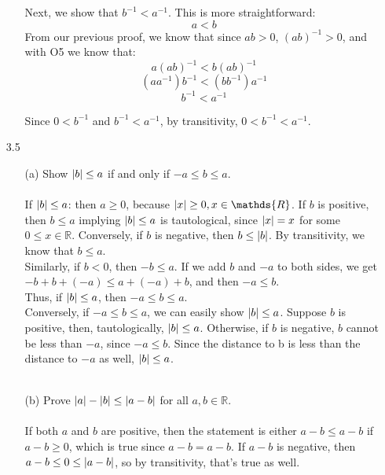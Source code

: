 \begin{itemize}
\begin{itemize}
        Next, we show that $b^{-1} < a^{-1}$. This is more straightforward:
        $$a < b$$
        From our previous proof, we know that since $ab > 0$, $(ab)^{-1} > 0$, and with O5 we know that:
        $$a(ab)^{-1} < b(ab)^{-1}$$
        $$(aa^{-1})b^{-1} < (bb^{-1})a^{-1}$$
        $$b^{-1} < a^{-1}$$

        Since $0 < b^{-1}$ and $b^{-1} < a^{-1}$, by transitivity, $0 < b^{-1} < a^{-1}$.
    \end{itemize}
  \item[3.5]
    \begin{itemize}
      \item [(a)] Show $\left\vert b \right\vert \leq a$ if and only if $-a \leq b \leq a$.\\\\

        If $\left\vert b \right\vert \leq a$: then $a \geq 0$, because $\abs{x} \geq 0, x \in \mathds{R}$. If $b$ is positive, then $b \leq a$ implying $\left\vert b \right\vert \leq a$ is tautological, since $\left\vert x \right\vert = x$ for some $0 \leq x \in \mathds{R}$. Conversely, if $b$ is negative, then $b \leq \left\vert b \right\vert$. By transitivity, we know that $b \leq a$.\\

        Similarly, if $b < 0$, then $-b \leq a$. If we add $b$ and $-a$ to both sides, we get $-b + b + (-a) \leq a + (-a) + b$, and then $-a \leq b$.\\

        Thus, if $\left\vert b \right\vert \leq a$, then $-a \leq b \leq a$.\\

        Conversely, if $-a \leq b \leq a$, we can easily show $\left\vert b \right\vert \leq a$. Suppose $b$ is positive, then, tautologically, $\left\vert b \right\vert \leq a$. Otherwise, if $b$ is negative, $b$ cannot be less than $-a$, since $-a \leq b$. Since the distance to b is less than the distance to $-a$ as well, $\left\vert b \right\vert \leq a$.\\\\


      \item [(b)] Prove $\left\vert a \right\vert - \left\vert b \right\vert \leq \left\vert a - b \right\vert$ for all $a, b \in \mathds{R}$.\\\\

        If both $a$ and $b$ are positive, then the statement is either $a - b \leq a - b$ if $a-b \geq 0$, which is true since $a-b = a-b$. If $a-b$ is negative, then $a - b \leq 0 \leq \left\vert a - b \right\vert$, so by transitivity, that's true as well.\\


\end{itemize}
\end{itemize}
